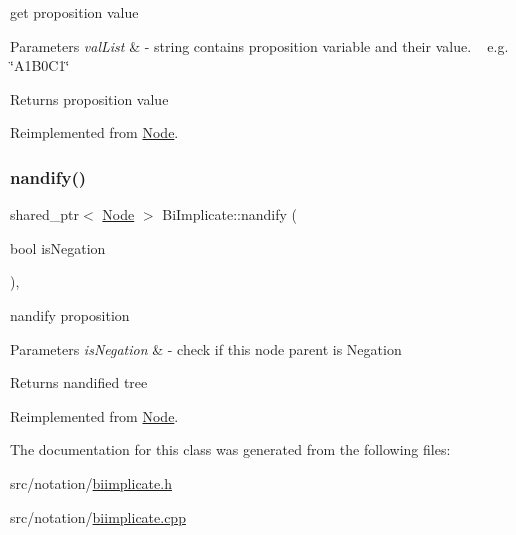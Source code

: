 get proposition value 


\begin{DoxyParams}{Parameters}
{\em val\+List} & -\/ string contains proposition variable and their value. ~\newline
 e.\+g. \char`\"{}\+A1\+B0\+C1\char`\"{} \\
\hline
\end{DoxyParams}
\begin{DoxyReturn}{Returns}
proposition value 
\end{DoxyReturn}


Reimplemented from \hyperlink{class_node_afd0c2045f3955e02e3aa1e2e987f10b2}{Node}.

\mbox{\label{class_bi_implicate_aa77f25616aa7a47ae4007d661ad60518}} 
\subsubsection{\texorpdfstring{nandify()}{nandify()}}
{\footnotesize\ttfamily shared\+\_\+ptr$<$ \hyperlink{class_node}{Node} $>$ Bi\+Implicate\+::nandify (\begin{DoxyParamCaption}\item[{bool}]{is\+Negation }\end{DoxyParamCaption})\hspace{0.3cm}{\ttfamily [override]}, {\ttfamily [virtual]}}



nandify proposition 


\begin{DoxyParams}{Parameters}
{\em is\+Negation} & -\/ check if this node parent is Negation \\
\hline
\end{DoxyParams}
\begin{DoxyReturn}{Returns}
nandified tree 
\end{DoxyReturn}


Reimplemented from \hyperlink{class_node_a3b2e192b59b7e72908af7903c5a4e5c1}{Node}.



The documentation for this class was generated from the following files\+:\begin{DoxyCompactItemize}
\item 
src/notation/\hyperlink{biimplicate_8h}{biimplicate.\+h}\item 
src/notation/\hyperlink{biimplicate_8cpp}{biimplicate.\+cpp}\end{DoxyCompactItemize}
